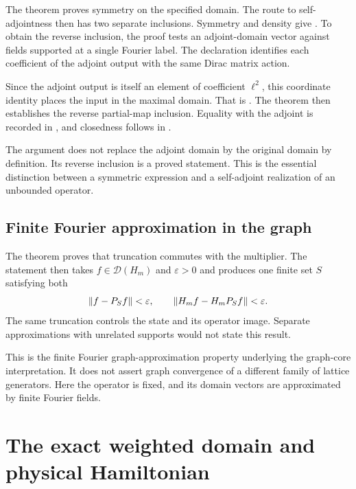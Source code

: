 The theorem  proves symmetry on the specified domain. The route to self-adjointness then has two separate inclusions. Symmetry and density give . To obtain the reverse inclusion, the proof tests an adjoint-domain vector against fields supported at a single Fourier label. The declaration  identifies each coefficient of the adjoint output with the same Dirac matrix action.

Since the adjoint output is itself an element of coefficient \(\ell^2\), this coordinate identity places the input in the maximal domain. That is . The theorem  then establishes the reverse partial-map inclusion. Equality with the adjoint is recorded in , and closedness follows in .

The argument does not replace the adjoint domain by the original domain by definition. Its reverse inclusion is a proved statement. This is the essential distinction between a symmetric expression and a self-adjoint realization of an unbounded operator.

\subsection{Finite Fourier approximation in the graph}

The theorem  proves that truncation commutes with the multiplier. The statement  then takes \(f\in\mathcal D(H_m)\) and \(\varepsilon>0\) and produces one finite set \(S\) satisfying both
\[
 \left\lVert f-P_Sf\right\rVert<\varepsilon,
 \qquad
 \left\lVert H_mf-H_mP_Sf\right\rVert<\varepsilon.
\]
The same truncation controls the state and its operator image. Separate approximations with unrelated supports would not state this result.

This is the finite Fourier graph-approximation property underlying the graph-core interpretation. It does not assert graph convergence of a different family of lattice generators. Here the operator is fixed, and its domain vectors are approximated by finite Fourier fields.

\section{The exact weighted domain and physical Hamiltonian}

